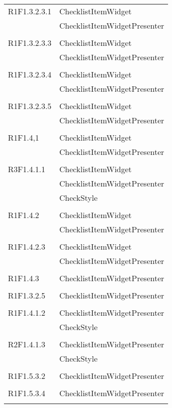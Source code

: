 \begin{center}
\begin{longtable}{|p{7cm}|p{7cm}|}
		R1F1.3.2.3.1 & ChecklistItemWidget \\ & ChecklistItemWidgetPresenter \\ & \\ \hline
		R1F1.3.2.3.3 & ChecklistItemWidget \\ & ChecklistItemWidgetPresenter \\ & \\ \hline
		R1F1.3.2.3.4 & ChecklistItemWidget \\ & ChecklistItemWidgetPresenter \\ & \\ \hline
		R1F1.3.2.3.5 & ChecklistItemWidget \\ & ChecklistItemWidgetPresenter \\ & \\ \hline
		R1F1.4,1 & ChecklistItemWidget \\ & ChecklistItemWidgetPresenter \\ & \\ \hline
		R3F1.4.1.1 & ChecklistItemWidget \\ & ChecklistItemWidgetPresenter \\ & CheckStyle \\ & \\ \hline
		R1F1.4.2 & ChecklistItemWidget \\ & ChecklistItemWidgetPresenter \\ & \\ \hline
		R1F1.4.2.3 & ChecklistItemWidget \\ & ChecklistItemWidgetPresenter \\ & \\ \hline
		R1F1.4.3 & ChecklistItemWidgetPresenter \\ & \\ \hline
		R1F1.3.2.5 & ChecklistItemWidgetPresenter \\ & \\ \hline
		R1F1.4.1.2 & ChecklistItemWidgetPresenter \\ & CheckStyle \\ & \\ \hline
		R2F1.4.1.3 & ChecklistItemWidgetPresenter \\ & CheckStyle \\ & \\ \hline
		R1F1.5.3.2 & ChecklistItemWidgetPresenter \\ & \\ \hline
		R1F1.5.3.4 & ChecklistItemWidgetPresenter \\ & \\ \hline

\end{longtable}
\end{center}
